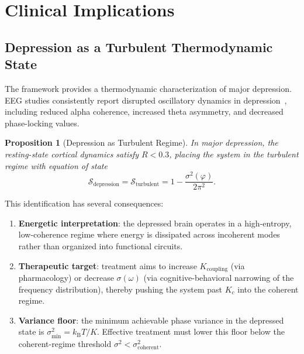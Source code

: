 \documentclass[aps,prd,twocolumn,superscriptaddress,floatfix,nofootinbib]{revtex4-2}
\newtheorem{proposition}[theorem]{Proposition}
\theoremstyle{remark}
\newcommand{\kB}{k_{\mathrm{B}}}
\newcommand{\Rorder}{R}
\newcommand{\Kc}{K_c}
\newcommand{\Sregime}{\mathcal{S}}
\begin{document}
\section{Clinical Implications}
\label{sec:clinical}

\subsection{Depression as a Turbulent Thermodynamic State}

The framework provides a thermodynamic characterization of major depression. EEG studies consistently report disrupted oscillatory dynamics in depression~\cite{fingelkurts2006altered,leuchter2012resting,uhlhaas2006neural}, including reduced alpha coherence, increased theta asymmetry, and decreased phase-locking values.

\begin{proposition}[Depression as Turbulent Regime]
\label{prop:depression}
In major depression, the resting-state cortical dynamics satisfy $\Rorder < 0.3$, placing the system in the turbulent regime with equation of state
\begin{equation}
    \Sregime_{\text{depression}} = \Sregime_{\text{turbulent}} = 1 - \frac{\sigma^2(\varphi)}{2\pi^2}.
    \label{eq:depression}
\end{equation}
\end{proposition}

This identification has several consequences:
\begin{enumerate}
    \item \textbf{Energetic interpretation}: the depressed brain operates in a high-entropy, low-coherence regime where energy is dissipated across incoherent modes rather than organized into functional circuits.
    \item \textbf{Therapeutic target}: treatment aims to increase $K_{\text{coupling}}$ (via pharmacology) or decrease $\sigma(\omega)$ (via cognitive-behavioral narrowing of the frequency distribution), thereby pushing the system past $\Kc$ into the coherent regime.
    \item \textbf{Variance floor}: the minimum achievable phase variance in the depressed state is $\sigma^2_{\min} = \kB T / K$. Effective treatment must lower this floor below the coherent-regime threshold $\sigma^2 < \sigma^2_{\text{coherent}}$.
\end{enumerate}
\end{document}

